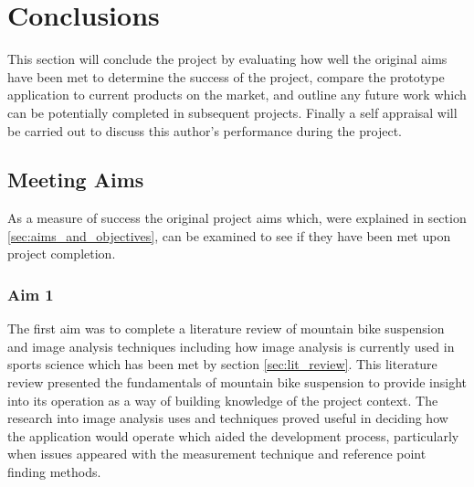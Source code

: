 \section{Conclusions}\label{sec:conclusion}
	This section will conclude the project by evaluating how well the original aims have been met to determine the success of the project, compare the prototype application to current products on the market, and outline any future work which can be potentially completed in subsequent projects. Finally a self appraisal will be carried out to discuss this author's performance during the project.
	\subsection{Meeting Aims}
		As a measure of success the original project aims which, were explained in section \ref{sec:aims_and_objectives}, can be examined to see if they have been met upon project completion. 
		\subsubsection{Aim 1}
			The first aim was to complete a literature review of mountain bike suspension and image analysis techniques including how image analysis is currently used in sports science which has been met by section \ref{sec:lit_review}. This literature review presented the fundamentals of mountain bike suspension to provide insight into its operation as a way of building knowledge of the project context. The research into image analysis uses and techniques proved useful in deciding how the application would operate which aided the development process, particularly when issues appeared with the measurement technique and reference point finding methods.
